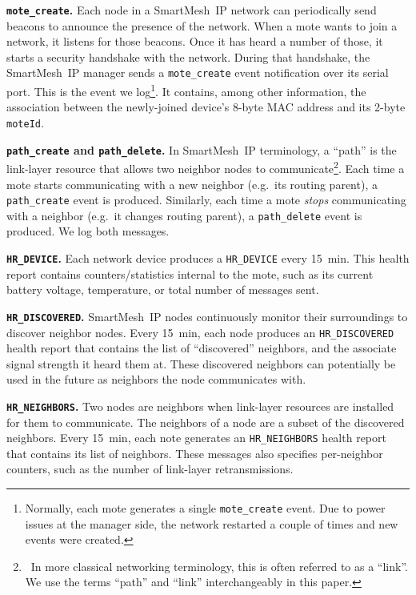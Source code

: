 \documentclass{sig-alternate}
\newcommand{\smip}                {SmartMesh~IP\xspace}
\newcommand{\HRNEIGHBORS}         {{\tt HR\_NEIGHBORS}\xspace}
\newcommand{\HRDISCOVERED}        {{\tt HR\_DISCOVERED}\xspace}
\newcommand{\HRDEVICE}            {{\tt HR\_DEVICE}\xspace}
\newcommand{\pathcreate}          {{\tt path\_create}\xspace}
\newcommand{\pathdelete}          {{\tt path\_delete}\xspace}
\newcommand{\motecreate}          {{\tt mote\_create}\xspace}
\newcommand{\moteId}              {{\tt moteId}\xspace}
\begin{document}
\textbf{\motecreate.}
Each node in a \smip network can periodically send beacons to announce the presence of the network.
When a mote wants to join a network, it listens for those beacons.
Once it has heard a number of those, it starts a security handshake with the network.
During that handshake, the \smip manager sends a \motecreate event notification over its serial port.
This is the event we log\footnote{Normally, each mote generates a single \motecreate event. Due to power issues at the manager side, the network restarted a couple of times and new events were created.}.
It contains, among other information, the association between the newly-joined device's 8-byte MAC address and its 2-byte \moteId.

\textbf{\pathcreate and \pathdelete.}
In \smip terminology, a ``path'' is the link-layer resource that allows two neighbor nodes to communicate\footnote{~In more classical networking terminology, this is often referred to as a ``link''. We use the terms ``path'' and ``link'' interchangeably in this paper.}.
Each time a mote starts communicating with a new neighbor (e.g.~its routing parent), a \pathcreate event is produced.
Similarly, each time a mote \textit{stops} communicating with a neighbor (e.g.~it changes routing parent), a \pathdelete event is produced.
We log both messages.

\textbf{\HRDEVICE.}
Each network device produces a \HRDEVICE every 15~min.
This health report contains counters/statistics internal to the mote, such as its current battery voltage, temperature, or total number of messages sent.

\textbf{\HRDISCOVERED.}
\smip nodes continuously monitor their surroundings to discover neighbor nodes.
Every 15~min, each node produces an \HRDISCOVERED health report that contains the list of ``discovered'' neighbors, and the associate signal strength it heard them at.
These discovered neighbors can potentially be used in the future as neighbors the node communicates with.

\textbf{\HRNEIGHBORS.}
Two nodes are neighbors when link-layer resources are installed for them to communicate.
The neighbors of a node are a subset of the discovered neighbors.
Every 15~min, each note generates an \HRNEIGHBORS health report that contains its list of neighbors.
These messages also specifies per-neighbor counters, such as the number of link-layer retransmissions.
\end{document}
